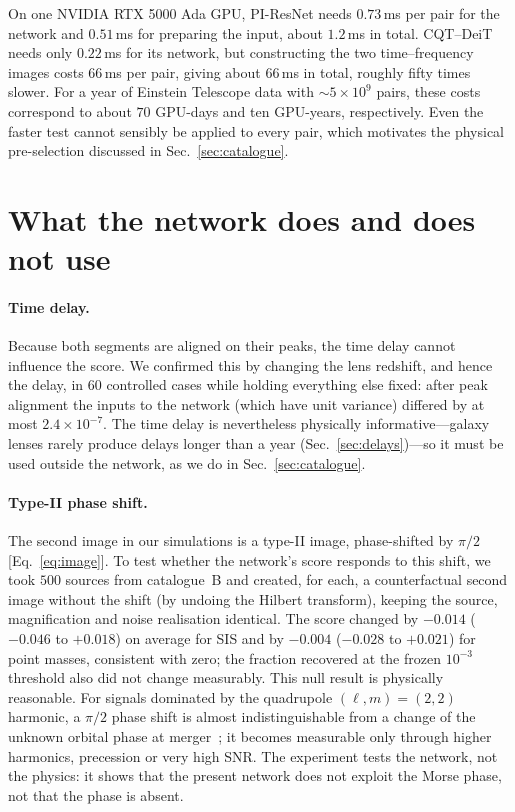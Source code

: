 \documentclass[aps,prd,twocolumn,superscriptaddress,nofootinbib,floatfix]{revtex4-2}
\newcommand{\PIR}{PI-ResNet}
\begin{document}
On one NVIDIA RTX 5000 Ada GPU, \PIR{} needs $0.73$\,ms per pair for the network and $0.51$\,ms for preparing the input, about $1.2$\,ms in total.
CQT--DeiT needs only $0.22$\,ms for its network, but constructing the two time--frequency images costs $66$\,ms per pair, giving about $66$\,ms in total, roughly fifty times slower.
For a year of Einstein Telescope data with $\sim5\times10^{9}$ pairs, these costs correspond to about $70$ GPU-days and ten GPU-years, respectively.
Even the faster test cannot sensibly be applied to every pair, which motivates the physical pre-selection discussed in Sec.~\ref{sec:catalogue}.

\section{What the network does and does not use}
\label{sec:diagnostics}

\paragraph*{Time delay.}
Because both segments are aligned on their peaks, the time delay cannot influence the score.
We confirmed this by changing the lens redshift, and hence the delay, in $60$ controlled cases while holding everything else fixed: after peak alignment the inputs to the network (which have unit variance) differed by at most $2.4\times10^{-7}$.
The time delay is nevertheless physically informative---galaxy lenses rarely produce delays longer than a year (Sec.~\ref{sec:delays})---so it must be used outside the network, as we do in Sec.~\ref{sec:catalogue}.

\paragraph*{Type-II phase shift.}
The second image in our simulations is a type-II image, phase-shifted by $\pi/2$ [Eq.~\eqref{eq:image}].
To test whether the network's score responds to this shift, we took $500$ sources from catalogue~B and created, for each, a counterfactual second image without the shift (by undoing the Hilbert transform), keeping the source, magnification and noise realisation identical.
The score changed by $-0.014$ ($-0.046$ to $+0.018$) on average for SIS and by $-0.004$ ($-0.028$ to $+0.021$) for point masses, consistent with zero; the fraction recovered at the frozen $10^{-3}$ threshold also did not change measurably.
This null result is physically reasonable.
For signals dominated by the quadrupole $(\ell,m)=(2,2)$ harmonic, a $\pi/2$ phase shift is almost indistinguishable from a change of the unknown orbital phase at merger~\cite{Ezquiaga2021,Wang2021typeII}; it becomes measurable only through higher harmonics, precession or very high SNR.
The experiment tests the network, not the physics: it shows that the present network does not exploit the Morse phase, not that the phase is absent.
\end{document}

